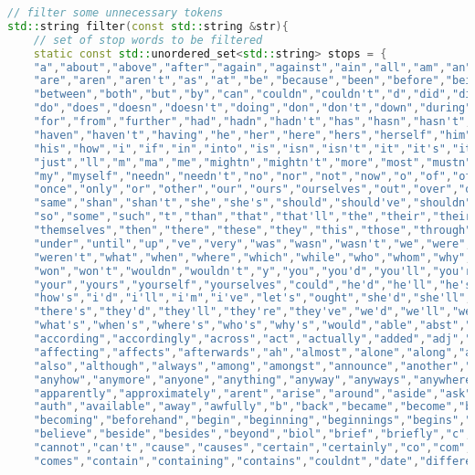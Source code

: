 \documentclass[12pt,a4paper]{scrartcl}
\begin{document}
\begin{lstlisting}[language=C++, basicstyle=\scriptsize]
// filter some unnecessary tokens
std::string filter(const std::string &str){
    // set of stop words to be filtered 
    static const std::unordered_set<std::string> stops = {
    "a","about","above","after","again","against","ain","all","am","an","and","any",
    "are","aren","aren't","as","at","be","because","been","before","being","below",
    "between","both","but","by","can","couldn","couldn't","d","did","didn","didn't",
    "do","does","doesn","doesn't","doing","don","don't","down","during","each","few",
    "for","from","further","had","hadn","hadn't","has","hasn","hasn't","have",
    "haven","haven't","having","he","her","here","hers","herself","him","himself",
    "his","how","i","if","in","into","is","isn","isn't","it","it's","its","itself",
    "just","ll","m","ma","me","mightn","mightn't","more","most","mustn","mustn't",
    "my","myself","needn","needn't","no","nor","not","now","o","of","off","on",
    "once","only","or","other","our","ours","ourselves","out","over","own","re","s",
    "same","shan","shan't","she","she's","should","should've","shouldn","shouldn't",
    "so","some","such","t","than","that","that'll","the","their","theirs","them",
    "themselves","then","there","these","they","this","those","through","to","too",
    "under","until","up","ve","very","was","wasn","wasn't","we","were","weren",
    "weren't","what","when","where","which","while","who","whom","why","will","with",
    "won","won't","wouldn","wouldn't","y","you","you'd","you'll","you're","you've",
    "your","yours","yourself","yourselves","could","he'd","he'll","he's","here's",
    "how's","i'd","i'll","i'm","i've","let's","ought","she'd","she'll","that's",
    "there's","they'd","they'll","they're","they've","we'd","we'll","we're","we've",
    "what's","when's","where's","who's","why's","would","able","abst","accordance",
    "according","accordingly","across","act","actually","added","adj","affected",
    "affecting","affects","afterwards","ah","almost","alone","along","already",
    "also","although","always","among","amongst","announce","another","anybody",
    "anyhow","anymore","anyone","anything","anyway","anyways","anywhere",
    "apparently","approximately","arent","arise","around","aside","ask","asking",
    "auth","available","away","awfully","b","back","became","become","becomes",
    "becoming","beforehand","begin","beginning","beginnings","begins","behind",
    "believe","beside","besides","beyond","biol","brief","briefly","c","ca","came",
    "cannot","can't","cause","causes","certain","certainly","co","com","come",
    "comes","contain","containing","contains","couldnt","date","different","done",

\end{lstlisting}
\end{document}

